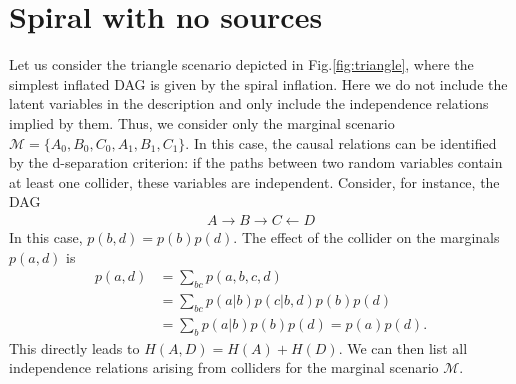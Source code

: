 \documentclass[reprint,pra, twocolumn, amsmath,amssymb,
 aps,superscriptaddress,]{revtex4-2}
\begin{document}
\section{Spiral with no sources}


Let us consider the triangle scenario depicted in Fig.\ref{fig:triangle}, where the simplest inflated DAG is given by the spiral inflation. Here we do not include the latent variables in the description and only include the independence relations implied by them. Thus, we consider only the marginal scenario $\mathcal{M} = \{A_0, B_0, C_0, A_1, B_1, C_1\}$. In this case, the causal relations can be identified by the d-separation criterion: if the paths between two random variables contain at least one collider, these variables are independent. Consider, for instance, the DAG
\begin{align}
    A\longrightarrow B \longrightarrow C \longleftarrow D
\end{align}
In this case, $p(b,d) = p(b)p(d)$. The effect of the collider on the marginals $p(a, d)$ is
%
\begin{align}
    p(a,d) &= \sum_{bc} p(a,b,c,d) \nonumber\\
            & = \sum_{bc} p(a|b)p(c|b,d)p(b)p(d) \nonumber\\
            & = \sum_{b} p(a|b)p(b)p(d) = p(a)p(d).
\end{align}
%
This directly leads to $H(A,D) = H(A)+H(D)$. We can then list all independence relations arising from colliders for the marginal scenario $\mathcal{M}$.
\end{document}
